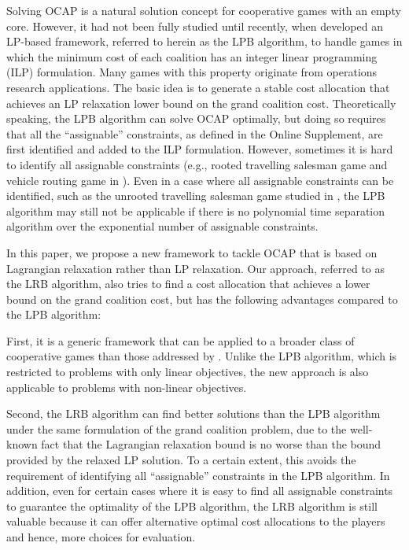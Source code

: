 \documentclass[ijoc,nonblindrev]{informs3} %
\begin{document}
Solving OCAP is a natural solution concept for cooperative games with an empty core.
However, it had not been fully studied until recently, when \cite{Caprara2010LPB} developed an LP-based framework, referred to herein as the LPB algorithm, to handle games in which the minimum cost of each coalition has an integer linear programming (ILP) formulation.
Many games with this property originate from operations research applications.
The basic idea is to generate a stable cost allocation that achieves an LP relaxation lower bound on the grand coalition cost.
Theoretically speaking, the LPB algorithm can solve OCAP optimally, but doing so requires that all the ``assignable'' constraints, as defined in the Online Supplement, are first identified and added to the ILP formulation. However, sometimes it is hard to identify all assignable constraints (e.g., rooted travelling salesman game and vehicle routing game in \citealt{Caprara2010LPB}).
Even in a case where all assignable constraints can be identified, such as the unrooted travelling salesman game studied in \cite{Caprara2010LPB}, the LPB algorithm may still not be applicable if there is no polynomial time separation algorithm over the exponential number of assignable constraints.

In this paper, we propose a new framework to tackle OCAP that is based on Lagrangian relaxation rather than LP relaxation. Our approach, referred to as the LRB algorithm, also tries to find a cost allocation that achieves a lower bound  on the grand coalition cost, but has the following advantages compared to the LPB algorithm:

First, it is a generic framework that can be applied to a broader class of cooperative games than those addressed by \cite{Caprara2010LPB}.
Unlike the LPB algorithm, which is restricted to problems with only linear objectives, the new approach is also applicable to problems with non-linear objectives.

Second, the LRB algorithm can find better solutions than the LPB algorithm under the same formulation of the grand coalition problem, due to the well-known fact that the Lagrangian relaxation bound is no worse than the bound provided by the relaxed LP solution. To a certain extent, this avoids the  requirement of identifying all ``assignable'' constraints in  the LPB algorithm. In addition, even for certain cases where it is easy to find all assignable constraints to  guarantee the optimality of the LPB algorithm, the LRB algorithm is still valuable because it can offer alternative optimal cost allocations to the players and hence, more choices for evaluation.
\end{document}
